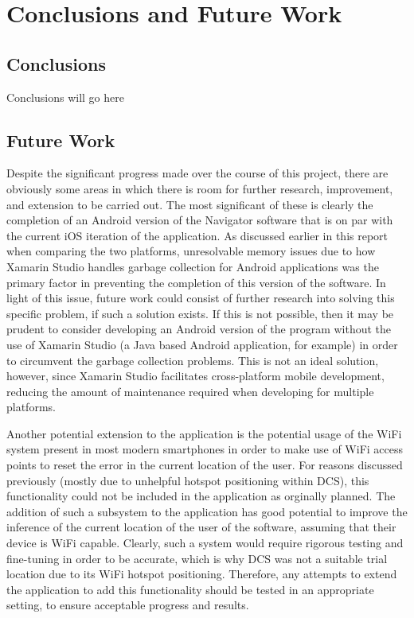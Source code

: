 \documentclass[main.tex]{subfiles}
\begin{document}
    \chapter{Conclusions and Future Work}
        \section{Conclusions}
            Conclusions will go here
        \section{Future Work}
            Despite the significant progress made over the course of this project, there are obviously some areas in which there is room for
            further research, improvement, and extension to be carried out. The most significant of these is clearly the completion of an Android version of the
            Navigator software that is on par with the current iOS iteration of the application. As discussed earlier in this report when comparing
            the two platforms, unresolvable memory issues due to how Xamarin Studio handles garbage collection for Android applications was the
            primary factor in preventing the completion of this version of the software. In light of this issue, future work could consist of further research
            into solving this specific problem, if such a solution exists. If this is not possible, then it may be prudent to consider developing an Android version
            of the program without the use of Xamarin Studio (a Java based Android application, for example) in order to circumvent the garbage collection problems. This is
            not an ideal solution, however, since Xamarin Studio facilitates cross-platform mobile development, reducing the amount of maintenance required when developing
            for multiple platforms.
            
            Another potential extension to the application is the potential usage of the WiFi system present in most modern smartphones in order to make use
            of WiFi access points to reset the error in the current location of the user. For reasons discussed previously (mostly due to unhelpful hotspot positioning within
            DCS), this functionality could not be included in the application as orginally planned. The addition of such a subsystem to the application has good potential to
            improve the inference of the current location of the user of the software, assuming that their device is WiFi capable. Clearly, such a system would require
            rigorous testing and fine-tuning in order to be accurate, which is why DCS was not a suitable trial location due to its WiFi hotspot positioning. Therefore, 
            any attempts to extend the application to add this functionality should be tested in an appropriate setting, to ensure acceptable progress and results.
            
\end{document}
